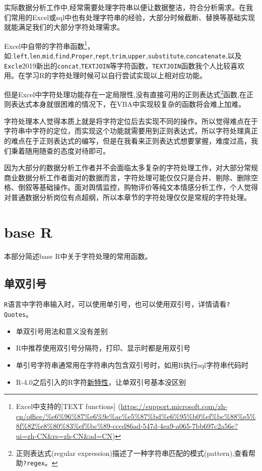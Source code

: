 \documentclass[
]{book}
\begin{document}
实际数据分析工作中,经常需要处理字符串以便让数据整洁，符合分析需求。在我们常用的Excel或sql中也有处理字符串的经验，大部分时候截断、替换等基础实现就能满足我们的大部分字符处理需求。

Excel中自带的字符串函数\footnote{Excel中支持的{[}TEXT functions{]} (\url{https://support.microsoft.com/zh-cn/office/\%e6\%96\%87\%e6\%9c\%ac\%e5\%87\%bd\%e6\%95\%b0\%ef\%bc\%88\%e5\%8f\%82\%e8\%80\%83\%ef\%bc\%89-cccd86ad-547d-4ea9-a065-7bb697c2a56e?ui=zh-CN\&rs=zh-CN\&ad=CN})}，如:\texttt{left},\texttt{len},\texttt{mid},\texttt{find},\texttt{Proper},\texttt{rept},\texttt{trim},\texttt{upper},\texttt{substitute},\texttt{concatenate},以及\texttt{Excle}2019新出的\texttt{concat},\texttt{TEXTJOIN}等字符函数，\texttt{TEXTJOIN}函数我个人比较喜欢用。在学习R的字符处理时候可以自行尝试实现以上相对应功能。

但是Excel中字符处理功能存在一定局限性,没有直接可用的正则表达式\footnote{正则表达式(regular expression)描述了一种字符串匹配的模式(pattern),查看帮助\texttt{?regex}。}函数,在正则表达式本身就很困难的情况下，在VBA中实现较复杂的函数将会难上加难。

字符处理本人觉得本质上就是将字符定位后去实现不同的操作。所以觉得难点在于字符串中字符的定位，而实现这个功能就需要用到正则表达式，所以字符处理真正的难点在于正则表达式的编写，但是在我看来正则表达式想要掌握，难度过高，我们秉着随用随查的态度对待即可。

因为大部分的数据分析工作者并不会面临太多复杂的字符处理工作，对大部分常规商业数据分析工作者面对的数据而言，字符处理可能仅仅只是合并、剔除、删除空格、倒叙等基础操作。面对舆情监控，购物评价等纯文本情感分析工作，个人觉得对普通数据分析岗位有点超纲，所以本章节的字符处理仅仅是常规的字符处理。

\hypertarget{base-r}{%
\section{base R}\label{base-r}}

本部分简述base R中关于字符处理的常用函数。

\hypertarget{ux5355ux53ccux5f15ux53f7}{%
\subsection{单双引号}\label{ux5355ux53ccux5f15ux53f7}}

\texttt{R}语言中字符串输入时，可以使用单引号，也可以使用双引号，详情请看\texttt{?Quotes}。

\begin{itemize}
\item
  单双引号用法和意义没有差别
\item
  R中推荐使用双引号分隔符，打印、显示时都是用双引号
\item
  单引号字符串通常用在字符串内包含双引号时，如用R执行sql字符串代码时
\item
  R-4.0之后引入的R字符\protect\hyperlink{ux65b0ux7279ux6027}{新特性}，让单双引号基本没区别
\end{itemize}
\end{document}
